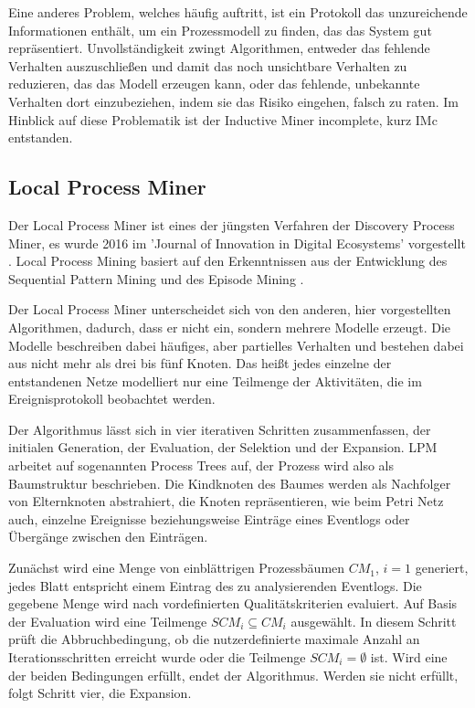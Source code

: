 Eine anderes Problem, welches häufig auftritt, ist ein Protokoll das unzureichende Informationen enthält, um ein Prozessmodell zu finden, das das System gut repräsentiert. Unvollständigkeit zwingt Algorithmen, entweder das fehlende Verhalten auszuschließen und damit das noch unsichtbare Verhalten zu reduzieren, das das Modell erzeugen kann, oder das fehlende, unbekannte Verhalten dort einzubeziehen, indem sie das Risiko eingehen, falsch zu raten. Im Hinblick auf diese Problematik ist der Inductive Miner incomplete, kurz IMc \cite{inducIMining} entstanden.

\subsection{Local Process Miner}
Der Local Process Miner ist eines der jüngsten Verfahren der Discovery Process Miner, es wurde 2016 im 'Journal of Innovation in Digital Ecosystems' vorgestellt \cite{localMining}. Local Process Mining basiert auf den Erkenntnissen aus der Entwicklung des Sequential Pattern Mining\cite{Srikant1996MiningSP} und des Episode Mining \cite{mannila1997discovery}.

Der Local Process Miner unterscheidet sich von den anderen, hier vorgestellten Algorithmen, dadurch, dass er nicht ein, sondern mehrere Modelle erzeugt. Die Modelle beschreiben dabei häufiges, aber partielles Verhalten und bestehen dabei aus nicht mehr als drei bis fünf Knoten. Das heißt jedes einzelne der entstandenen Netze modelliert nur eine Teilmenge der Aktivitäten, die im Ereignisprotokoll beobachtet werden. 

Der Algorithmus lässt sich in vier iterativen Schritten zusammenfassen, der initialen Generation, der Evaluation, der Selektion und der Expansion. LPM arbeitet auf sogenannten Process Trees auf, der Prozess wird also als Baumstruktur beschrieben. Die  Kindknoten des Baumes werden als Nachfolger von Elternknoten abstrahiert, die Knoten repräsentieren, wie beim Petri Netz auch, einzelne Ereignisse beziehungsweise Einträge eines Eventlogs oder Übergänge zwischen den Einträgen. 

Zunächst wird eine Menge von einblättrigen Prozessbäumen $CM_1$, $i=1$ generiert, jedes Blatt entspricht einem Eintrag des zu analysierenden Eventlogs. Die gegebene Menge wird nach vordefinierten Qualitätskriterien evaluiert. Auf Basis der Evaluation wird eine Teilmenge $SCM_i \subseteq CM_i$ ausgewählt. In diesem Schritt prüft die Abbruchbedingung, ob die nutzerdefinierte maximale Anzahl an Iterationsschritten erreicht wurde oder die Teilmenge $SCM_i=∅$  ist. Wird eine der beiden Bedingungen erfüllt, endet der Algorithmus. Werden sie nicht erfüllt, folgt Schritt vier, die Expansion. 

